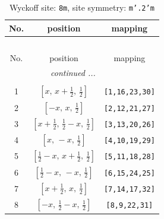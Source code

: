 \documentclass[fleqn,8pt]{jsarticle}
\begin{document}
\begin{longtable}{ccc}
\caption{Wyckoff site: {\tt 8m}, site symmetry: {\tt m'.2'm}}
 \\
 \hline \hline
No. & position & mapping \\ \hline \endfirsthead

\multicolumn{2}{l}{\tablename\ \thetable{}} \\
 \hline \hline
No. & position & mapping \\ \hline \endhead

 \hline \hline
\multicolumn{2}{r}{\footnotesize\it continued ...} \\ \endfoot

 \hline \hline
\multicolumn{2}{r}{} \\ \endlastfoot

1 & $\left[ x,\, x + \frac{1}{2},\, \frac{1}{2} \right]$ & {\tt [1,16,23,30]} \\ \hline
2 & $\left[ - x,\, x,\, \frac{1}{2} \right]$ & {\tt [2,12,21,27]} \\ \hline
3 & $\left[ x + \frac{1}{2},\, \frac{1}{2} - x,\, \frac{1}{2} \right]$ & {\tt [3,13,20,26]} \\ \hline
4 & $\left[ x,\, - x,\, \frac{1}{2} \right]$ & {\tt [4,10,19,29]} \\ \hline
5 & $\left[ \frac{1}{2} - x,\, x + \frac{1}{2},\, \frac{1}{2} \right]$ & {\tt [5,11,18,28]} \\ \hline
6 & $\left[ \frac{1}{2} - x,\, - x,\, \frac{1}{2} \right]$ & {\tt [6,15,24,25]} \\ \hline
7 & $\left[ x + \frac{1}{2},\, x,\, \frac{1}{2} \right]$ & {\tt [7,14,17,32]} \\ \hline
8 & $\left[ - x,\, \frac{1}{2} - x,\, \frac{1}{2} \right]$ & {\tt [8,9,22,31]} \\
\end{longtable}
\renewcommand{\arraystretch}{1.2}
\end{document}
